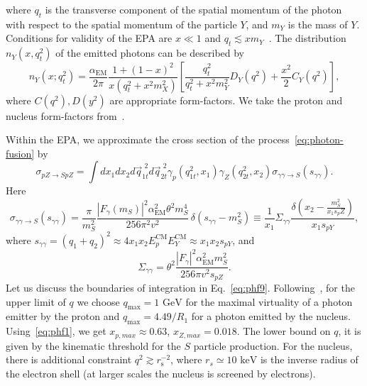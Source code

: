 \documentclass[a4paper,12pt,dvipsnames,usernames]{article}
\begin{document}
where $q_t$ is the transverse component of the spatial momentum of the photon with respect to the spatial momentum of the particle $Y$, and $m_{Y}$ is the mass of $Y$. Conditions for validity of the EPA are $x\ll 1$ and $q_t\lesssim x m_{Y}$~\cite{Dobrich:2015jyk}. The distribution $n_{Y}(x,q_{t}^{2})$ of the emitted photons can be described by
\begin{equation}
\label{eq:phf3}
n_Y(x; q_t^2)=\frac{\alpha_{\text{EM}}}{2\pi}
\frac{1 + (1 -x)^2}{x(q_t^2+x^2 m_{X}^2)}\left[
\frac{q_t^2}{q_t^2+x^2 m_Y^2}D_{Y}(q^2)+\frac{x^2}2 C_{Y}(q^2)\right],
\end{equation}
where $C(q^{2}),D(y^{2})$ are appropriate form-factors. We take the proton and nucleus form-factors from~\cite{Dobrich:2015jyk}.

Within the EPA, we approximate the cross section of the process~\eqref{eq:photon-fusion} by
\begin{equation}
\label{eq:phf9}
\sigma_{pZ\rightarrow SpZ}=\int dx_1 dx_2 d\vec q^{\,\,2}_{1t} d\vec q_{2t}^{\,\,2}
\gamma_p(q_{1t}^2,x_1)\gamma_Z(q_{2t}^2,x_2)\sigma_{\gamma\gamma\to S}(s_{\gamma\gamma}).
\end{equation}
Here
\begin{equation}
\label{eq:sigmaphiphi}
    \sigma_{\gamma\gamma\to S}(s_{\gamma\gamma}) = 
    \frac{\pi}{ m_S^2} \frac{|F_\gamma(m_S)|^{2} \alpha_{\text{EM}}^2 \theta^2 m_S^4}{256 \pi^2 v^2}\,\delta(s_{\gamma\gamma} - m_S^2) \equiv\frac{1}{x_{1}}\Sigma_{\gamma\gamma} \frac{\delta\left(x_2 - \frac{m_S^2}{x_1 s_{p}Z}\right)}{x_{1}s_{pY}},
\end{equation}
where $s_{\gamma\gamma}=(q_1+q_2)^2 \approx 4x_1x_2E_{p}^{\text{CM}}E_{Y}^{\text{CM}} \approx x_{1}x_{2}s_{pY}$, and 
\begin{equation}
    \Sigma_{\gamma\gamma} = \theta^{2}\frac{|F_{\gamma}|^{2}\alpha_{\text{EM}}^{2}m_{S}^{2}}{256 \pi v^{2}s_{pZ}}.
\end{equation}
Let us discuss the boundaries of integration in Eq.~\eqref{eq:phf9}. Following~\cite{Dobrich:2015jyk}, for the upper limit of $q$ we choose $q_{\text{max}} = 1\text{ GeV}$ for the maximal virtuality of a photon emitter by the proton and $q_{\text{max}} = 4.49/R_{1}$ for a photon emitted by the nucleus. Using~\eqref{eq:phf1}, we get $x_{p,max}\approx 0.63$,  $x_{Z,max}=0.018$. The lower bound on $q$, it is given by the kinematic threshold for the $S$ particle production. For the nucleus, there is additional constraint $q^{2} \gtrsim r_{\text{s}}^{-2}$, where $r_{s} \simeq 10\text{ keV}$ is the inverse radius of the electron shell (at larger scales the nucleus is screened by electrons).
\end{document}
